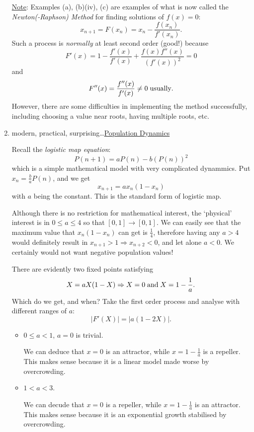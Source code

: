 \documentclass[12pt]{report}
\theoremstyle{definition}
\begin{document}
\begin{ex}
\begin{enumerate}[label = (\alph*)]
\underline{Note}: Examples (a), (b)(iv), (c) are examples of what is now called %
the \emph{Newton(-Raphson) Method} for finding solutions of $f(x) = 0$: \[%
    x_{n + 1} = F(x_n) = x_n - \frac{f(x_n)}{f'(x_n)}.
\]
Such a process is \emph{normally} at least second order (good!) because \[
    F'(x) = 1 - \frac{f'(x)}{f'(x)} + \frac{f(x)f''(x)}{{(f'(x))}^{2}} = 0
\]and\[
F''(x) = \frac{f''(x)}{f'(x)} \neq 0 \;\textnormal{usually}.
\]
However, there are some difficulties in implementing the method successfully,
including choosing a value near roots, having multiple roots, etc.
    
\item modern, practical, surprising\ldots \underline{Population Dynamics}

    Recall the \emph{logistic map equation}:\[
        P(n + 1) = aP(n) - b{(P(n))}^{2}
    \]
    which is a simple mathematical model with very complicated dynammics.
    Put $x_n = \frac{b}{a}P(n)$, and we get\[
        x_{n + 1} = ax_n(1 - x_n)
    \]
    with $a$ being the constant. This is the standard form of logistic map.

    Although there is no restriction for mathematical interest,
    the `physical' interest is in $0 \le a \le 4$ so that $[0, 1] \rightarrow{} [0, 1]$.
    We can easily see that the maximum value that $x_n (1 - x_n)$ can get is $\frac{1}{4}$,
    therefore having any $a > 4$ would definitely result in $x_{n + 1} > 1 \Rightarrow{}
    x_{n + 2} < 0$, and let alone $a < 0$.
    We certainly would not want negative population values!

    There are evidently two fixed points satisfying\[
        X = aX(1 - X) \Rightarrow{} X = 0 \;\textnormal{and}\; X = 1 - \frac{1}{a}.
    \]
    Which do we get, and when?
    Take the first order process and analyse with different ranges of $a$:\[
        |F'(X)| = |a(1 - 2X)|.
    \]
    \begin{itemize}
        \item $0 \le a < 1$, $a = 0$ is trivial.

            We can deduce that $x = 0$ is an attractor,
            while $x = 1 - \frac{1}{a}$ is a repeller.
            This makes sense because it is a linear model made worse by overcrowding.

        \item $1 < a < 3$.

            We can decude that $x= 0$ is a repeller,
            while $x = 1 - \frac{1}{a}$ is an attractor.
            This makes sense because it is an exponential growth stabilised by overcrowding.


\end{itemize}
\end{enumerate}
\end{ex}
\end{document}
